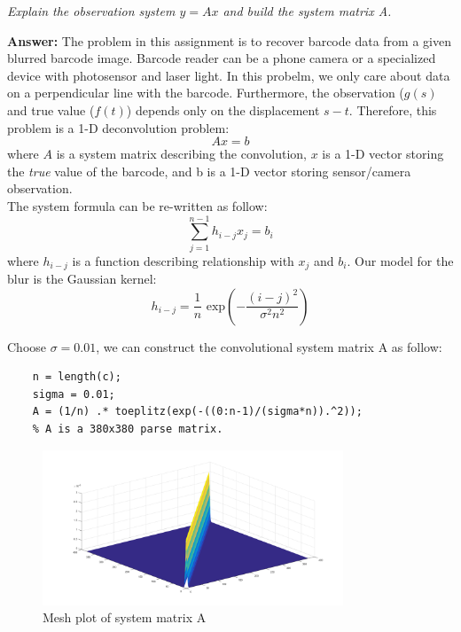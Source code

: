 \documentclass[a4paper,12pt]{article}
\begin{document}
\textit{Explain the observation system $y = Ax$ and build the system matrix A.} 

\vspace{1.5em}
\noindent
\textbf{Answer:} 
\noindent
The problem in this assignment is to recover barcode data from a given blurred barcode image. Barcode reader can be a phone camera or a specialized device with photosensor and laser light. In this probelm, we only care about data on a perpendicular line with the barcode. Furthermore, the observation ($g(s)$ and true value ($f(t)$) depends only on the displacement $s-t$. Therefore, this problem is a 1-D deconvolution problem:
$$ Ax = b $$
where $A$ is a system matrix describing the convolution, $x$ is a 1-D vector storing the \emph{true} value of the barcode, and b is a 1-D vector storing sensor/camera observation. \\ 

The system formula can be re-written as follow: 
$$ \sum_{j=1}^{n-1} h_{i-j}x_j = b_i $$
where $h_{i-j}$ is a function describing relationship with $x_j$ and $b_i$. Our model for the blur is the Gaussian kernel:
$$ h_{i-j} = \frac{1}{n} \mbox{ exp}\left(-\frac{(i-j)^2}{\sigma^2 n^2} \right) $$

Choose $\sigma = 0.01$, we can construct the convolutional system matrix A as follow:

\begin{lstlisting}[caption={MATLAB code for system matrix A. }]
	% Get length of the observation vector from given c in decom.m
	n = length(c);
	sigma = 0.01;
	A = (1/n) .* toeplitz(exp(-((0:n-1)/(sigma*n)).^2));
	% A is a 380x380 parse matrix.
\end{lstlisting}

\begin{figure}[h]
	\centering
	\includegraphics[width=0.8\textwidth]{matA.png}
	\caption{Mesh plot of system matrix A}
	\label{fig:matA}
\end{figure}
 
\end{document}
